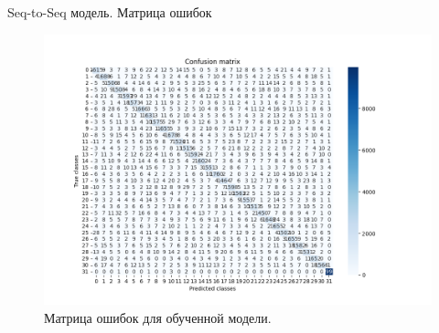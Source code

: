 \documentclass[12pt,a4paper,mathserif]{beamer}
\begin{document}
\begin{frame}{Seq-to-Seq модель. Матрица ошибок}
    \begin{figure}[H]
        \centering
        \includegraphics[width=0.85\linewidth]{imgs/Confusion_matrix.png}
        \caption{Матрица ошибок для обученной модели.}
        \label{fig:cm}
    \end{figure}
\end{frame}
\end{document}
